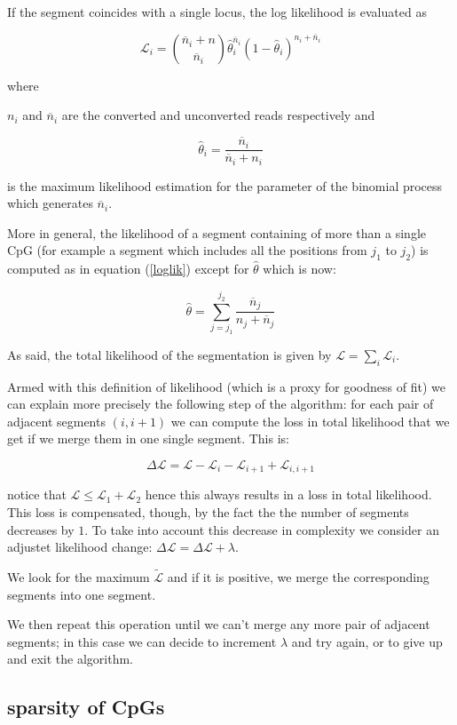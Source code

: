 \documentclass[11pt]{amsart}
\newcommand{\lik}{\ensuremath{\mathcal{L}}}
\begin{document}
If the
segment coincides with a single locus, 
the log likelihood  is evaluated as 

\[\lik_i={\overline{n}_i+n \choose \overline{n}_i}
	\hat{\theta}_i^{\overline{n}_i}(1-\hat{\theta}_i)^{n_i+\overline{n}_i}\]
\label{loglik}

where

$n_i$ and $\overline{n}_i$ are the converted and unconverted reads respectively 
and

\[\hat{\theta}_i=\frac{\overline{n}_i}{\overline{n}_i+n_i}\]

is the maximum likelihood estimation for the parameter of the binomial process 
which generates $\overline{n}_i$.

More in general, the likelihood of a segment containing of more than a single CpG  
(for example a segment which includes all the positions from $j_1$ to $j_2$) is 
computed as in equation (\ref{loglik}) except for $\hat{\theta}$ which is now:

\[
\hat{\theta}=\sum_{j=j_1}^{j_2} \frac{\overline{n}_j}{n_j+\overline{n}_j}
\]


As said, the total likelihood of the segmentation is given by 
$\mathcal{L}=\sum_i\mathcal{L}_i$.


Armed with this definition of likelihood (which is a proxy for goodness of fit) 
we can explain more precisely the following step of the algorithm:
for each pair of adjacent segments $(i,i+1)$ we can compute the loss in 
total likelihood that we get if we merge them
in one single segment. This is:

\[\Delta \lik=\lik-\mathcal{L}_i-\mathcal{L}_{i+1}+\mathcal{L}_{i,i+1}\]

notice that $\mathcal{L} \leq \mathcal{L}_1+\mathcal{L}_2$ hence this always 
results in a loss in total 
likelihood. This loss is compensated, though, by the fact the the number 
of segments decreases by $1$. To take into account this decrease in 
complexity we consider an adjustet likelihood change:
$\Delta \lik = \Delta \lik+\lambda$.

We look for the maximum $\tilde{\lik}$ and if it is positive, we merge the
corresponding segments into one segment.

We then repeat this operation until we can't merge any more pair of adjacent 
segments; in this case we can decide to increment 
$\lambda$ and try again, or to give up and exit the algorithm.

\subsection{sparsity of CpGs}
\end{document}
